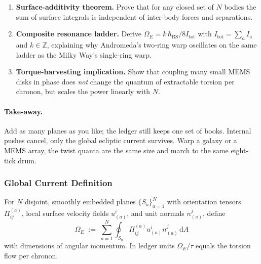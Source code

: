 \documentclass[11pt,oneside]{book}
\begin{document}
\begin{enumerate}[label=\arabic*.,leftmargin=*,itemsep=3pt]
\item \textbf{Surface-additivity theorem.}  
      Prove that for any closed set of \(N\) bodies the sum of surface
      integrals is independent of inter-body forces and separations.
\item \textbf{Composite resonance ladder.}  
      Derive \(\dot\Omega_{E}=k\,\hbar_{\mathrm{RS}}/8I_{\text{tot}}\)
      with \(I_{\text{tot}}=\sum_{a}I_{a}\) and \(k\in\mathbb Z\),
      explaining why Andromeda’s two-ring warp oscillates on the same
      ladder as the Milky Way’s single-ring warp.
\item \textbf{Torque-harvesting implication.}  
      Show that coupling many small MEMS disks in phase does \emph{not}
      change the quantum of extractable torsion per chronon, but
      scales the power linearly with \(N\).
\end{enumerate}

\paragraph{Take-away.}
Add as many planes as you like; the ledger still keeps one set of
books.  Internal pushes cancel, only the global ecliptic current
survives.  Warp a galaxy or a MEMS array, the twist quanta are the
same size and march to the same eight-tick drum.



\subsubsection{Global Current Definition}
\label{ss:OmegaE-def}

For $N$ disjoint, smoothly embedded planes $\{S_a\}_{a=1}^N$ with
orientation tensors $\Pi_{ij}^{(a)}$, local surface velocity fields
$u_{(a)}^{i}$, and unit normals $n_{(a)}^{j}$, define
\begin{equation}
   \boxed{\;
      \Omega_{E}
      \;:=\;
      \sum_{a=1}^{N}
      \oint_{S_a}
         \Pi_{ij}^{(a)} u_{(a)}^{i} n_{(a)}^{j}\,
         \mathrm dA
      \;}
   \label{eq:OmegaE}
\end{equation}
with dimensions of angular momentum.  In ledger units
$\Omega_{E}/\tau$ equals the torsion flow per chronon.
\end{document}
